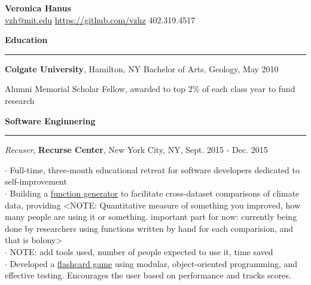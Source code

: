 \documentclass[11pt]{article}
\begin{document}
\bigskip
\begin{flushleft}
\LARGE{\textbf{Veronica Hanus}}\\
\large{\href{mailto:vzh@mit.edu}{vzh@mit.edu}} \hspace*{0.002in} \normalsize{\url{https://github.com/vzhz}} \hspace*{0.002in} \normalsize{402.319.4517}\\
\end{flushleft}
\smallskip

\vspace*{0.25 mm}
\textbf{Education}
\smallskip
\hrule 
\textbf{Colgate University}, Hamilton, NY\hspace*{2.2 in} 	Bachelor of Arts, Geology, May 2010\\	
\begin{small}Alumni Memorial Scholar Fellow, awarded to top 2\% of each class year to fund research\end{small}

\vspace*{0.25 mm}
\textbf{Software Enginnering}
\smallskip
\hrule
\emph{Recuser}, \textbf {Recurse Center}, New York City, NY, Sept. 2015 - Dec. 2015 \\ 
\begin{small}$\cdot$ {Full-time, three-month educational retreat for software developers dedicated to self-improvement}\\ 
$\cdot$ {Building a \href{https://github.com/vzhz/function_generator/blob/master/README.md}{function generator} to facilitate cross-dataset comparisons of climate data, providing <NOTE: Quantitative measure of something you improved, how many people are using it or something. important part for now: currently being done by researchers using functions written by hand for each comparision, and that is bolony>}\\
$\cdot$ {NOTE: add tools used, number of people expected to use it, time saved}\\
$\cdot$ {Developed a \href{https://github.com/vzhz/geography_guessing_game/blob/master/README.md}{flashcard game} using modular, object-oriented programming, and effective testing. Encourages the user based on performance and tracks scores.}\end{small}
\end{document}
